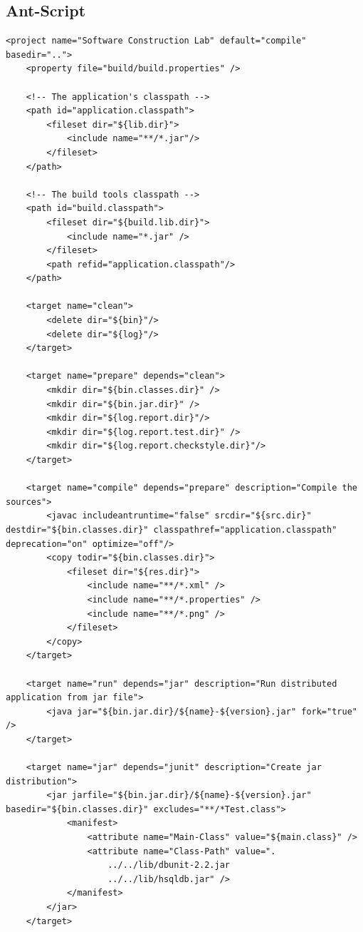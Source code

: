 \documentclass[a4paper,10pt]{article}
\begin{document}
\subsection{Ant-Script}
\begin{lstlisting}
<project name="Software Construction Lab" default="compile" basedir="..">
    <property file="build/build.properties" />
	
    <!-- The application's classpath -->
    <path id="application.classpath">
        <fileset dir="${lib.dir}">
            <include name="**/*.jar"/>
        </fileset>
    </path>
    
    <!-- The build tools classpath -->
    <path id="build.classpath">
        <fileset dir="${build.lib.dir}">
            <include name="*.jar" />
        </fileset>
        <path refid="application.classpath"/>
    </path>
	
    <target name="clean">
    	<delete dir="${bin}"/>
    	<delete dir="${log}"/>
    </target>
	
    <target name="prepare" depends="clean">
        <mkdir dir="${bin.classes.dir}" />
        <mkdir dir="${bin.jar.dir}" />
        <mkdir dir="${log.report.dir}"/>
    	<mkdir dir="${log.report.test.dir}" />
    	<mkdir dir="${log.report.checkstyle.dir}"/>
    </target>

    <target name="compile" depends="prepare" description="Compile the sources">
        <javac includeantruntime="false" srcdir="${src.dir}" destdir="${bin.classes.dir}" classpathref="application.classpath" deprecation="on" optimize="off"/>
        <copy todir="${bin.classes.dir}">
            <fileset dir="${res.dir}">
                <include name="**/*.xml" />
                <include name="**/*.properties" />
                <include name="**/*.png" />
            </fileset>
        </copy>
    </target>

    <target name="run" depends="jar" description="Run distributed application from jar file">
        <java jar="${bin.jar.dir}/${name}-${version}.jar" fork="true" />
    </target>

    <target name="jar" depends="junit" description="Create jar distribution">
        <jar jarfile="${bin.jar.dir}/${name}-${version}.jar" basedir="${bin.classes.dir}" excludes="**/*Test.class">
            <manifest>
                <attribute name="Main-Class" value="${main.class}" />
                <attribute name="Class-Path" value=".
                    ../../lib/dbunit-2.2.jar
                    ../../lib/hsqldb.jar" />  
            </manifest>
        </jar>
    </target>
	

\end{lstlisting}
\end{document}

